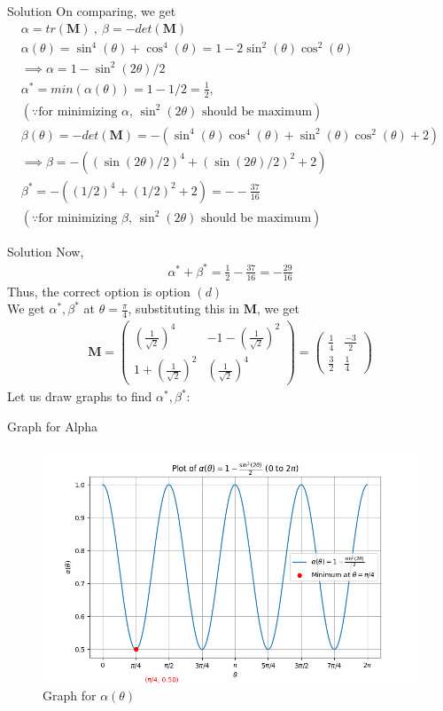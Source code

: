 \documentclass{beamer}
\renewcommand{\vec}[1]{\mathbf{#1}}
\providecommand{\brak}[1]{\ensuremath{\left(#1\right)}}
\theoremstyle{remark}
\newcommand{\myvec}[1]{\ensuremath{\begin{pmatrix}#1\end{pmatrix}}}
\begin{document}
\begin{frame}{Solution}
On comparing, we get
\begin{align}
    \alpha = tr\brak{\vec{M}} \ , \ \beta = - det\brak{\vec{M}}\\
    \alpha\brak{\theta}=\sin^4\brak{\theta}+\cos^4\brak{\theta} = 1-2\sin^2\brak{\theta}\cos^2\brak{\theta}\\
    \implies \alpha = 1 -\sin^2\brak{2\theta}/2 \\
    \alpha^*  = min\brak{\alpha\brak{\theta}}= 1- 1/2 = \frac{1}{2} ,\\ \brak{\because \text{for minimizing $\alpha$,  $\sin^2\brak{2\theta}$ should be maximum}}\nonumber\\
    \beta\brak{\theta} = - det\brak{\vec{M}} = - \brak{\sin^4\brak{\theta}\cos^4\brak{\theta} + \sin^2\brak{\theta}\cos^2\brak{\theta} +2}\\
    \implies \beta = - \brak{ \brak{\sin\brak{2\theta}/2}^4 + \brak{\sin\brak{2\theta}/2}^2 + 2} \\
    \beta^* = - \brak{ \brak{1/2}^4 + \brak{1/2}^2 + 2}=--\frac{37}{16}\\
    \brak{\because \text{for minimizing $\beta$,  $\sin^2\brak{2\theta}$ should be maximum}}\nonumber
\end{align}
\end{frame}
\begin{frame}{Solution}
    Now, 
\begin{align}
    \alpha^*+\beta^* = \frac{1}{2} - \frac{37}{16} = -\frac{29}{16}
\end{align}
Thus,  the correct option is option $\brak{d}$\\
We get $\alpha^*, \beta^*$ at $\theta = \frac{\pi}{4}$, substituting this in $\vec{M}$, we get
\begin{align}
    \vec{M}=\myvec{\brak{\frac{1}{\sqrt{2}}}^ 4 & -1-\brak{\frac{1}{\sqrt{2}}}^2 \\  1+\brak{\frac{1}{\sqrt{2}}}^2 & \brak{\frac{1}{\sqrt{2}}}^ 4} = \myvec{\frac{1}{4} & \frac{-3}{2} \\ \frac{3}{2} &\frac{1}{4}}
\end{align}
Let us draw graphs to find $\alpha^*, \beta^*$:
\end{frame}
\begin{frame}{Graph for Alpha}
    \begin{figure}
    \centering
    \includegraphics[width=0.5\columnwidth]{figs/alpha.png}
    \caption{Graph for $\alpha\brak{\theta}$}
    \label{fig:placeholder}
\end{figure}
\end{frame}
\end{document}
